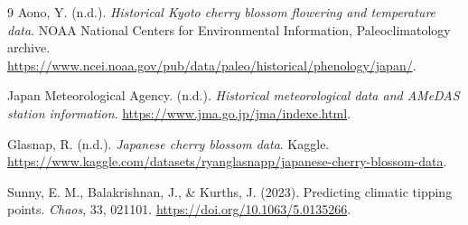 \documentclass[11pt,a4paper]{article}
\begin{document}
\begin{thebibliography}{9}
Aono, Y. (n.d.). \emph{Historical Kyoto cherry blossom flowering and temperature data}. NOAA National Centers for Environmental Information, Paleoclimatology archive. \url{https://www.ncei.noaa.gov/pub/data/paleo/historical/phenology/japan/}.

Japan Meteorological Agency. (n.d.). \emph{Historical meteorological data and AMeDAS station information}. \url{https://www.jma.go.jp/jma/indexe.html}.

Glasnap, R. (n.d.). \emph{Japanese cherry blossom data}. Kaggle. \url{https://www.kaggle.com/datasets/ryanglasnapp/japanese-cherry-blossom-data}.

Sunny, E. M., Balakrishnan, J., \& Kurths, J. (2023). Predicting climatic tipping points. \emph{Chaos}, 33, 021101. \url{https://doi.org/10.1063/5.0135266}.
\end{thebibliography}
\end{document}
